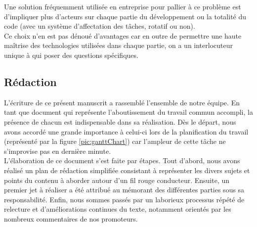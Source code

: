 Une solution fréquemment utilisée en entreprise pour pallier à ce problème est d'impliquer plus d'acteurs sur chaque partie du développement ou la totalité du code (avec un système d'affectation des tâches, rotatif ou non). \\

Ce choix n'en est pas dénoué d'avantages car en outre de permettre une haute maîtrise des technologies utilisées dans chaque partie, on a un interlocuteur unique à qui poser des questions spécifiques.



\subsection*{Rédaction}




L'écriture de ce présent manuscrit a rassemblé l'ensemble de notre équipe. En tant que document qui représente l'aboutissement du travail commun accompli, la présence de chacun est indispensable dans sa réalisation. Dès le départ, nous avons accordé une grande importance à celui-ci lors de la planification du travail (représenté par la figure \ref{pic:ganttChart}) car l'ampleur de cette tâche ne s'improvise pas en dernière minute. \\

L'élaboration de ce document s'est faite par étapes. Tout d'abord, nous avons réalisé un plan de rédaction simplifiée consistant à représenter les divers sujets et points du contenu à aborder autour d'un fil rouge conducteur. Ensuite, un premier jet à réaliser a été attribué au mémorant des différentes parties sous sa responsabilité. Enfin, nous sommes passés par un laborieux processus répété de relecture et d'améliorations continues du texte, notamment orientés par les nombreux commentaires de nos promoteurs.